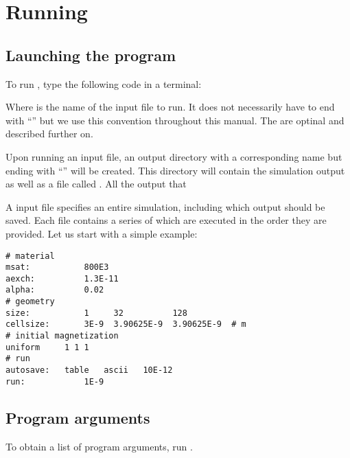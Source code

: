 \section{Running}

\subsection{Launching the program}

To run \prog, type the following code in a terminal:


Where \textit{} is the name of the input file to run. It does not necessarily have to end with ``'' but we use this convention throughout this manual. The \textit{} are optinal and described further on. 

Upon running an input file, an output directory with a corresponding name but ending with ``'' will be created. This directory will contain the simulation output as well as a file called . All the output that 

A \prog input file specifies an entire simulation, including which output should be saved. Each file contains a series of  which are executed in the order they are provided. Let us start with a simple example:


\begin{verbatim}
# material
msat:       	800E3 
aexch:      	1.3E-11
alpha:      	0.02
# geometry 
size:       	1     32          128    
cellsize:   	3E-9  3.90625E-9  3.90625E-9  # m
# initial magnetization
uniform		1 1 1
# run
autosave:	table	ascii	10E-12
run:          	1E-9
\end{verbatim}


\subsection{Program arguments}\label{arguments}

To obtain a list of program arguments, run \prog {}.

